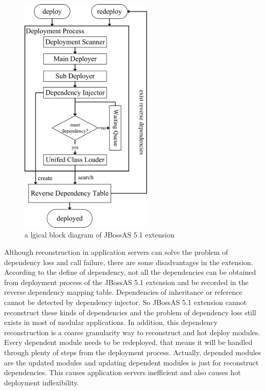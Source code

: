 \documentclass[conference]{IEEEtran}
\begin{document}
\begin{figure}[!t]
\centering
\includegraphics[width=2.5in]{deployment_process.jpg}
\caption{a lgical block diagram of JBossAS 5.1 extension}
\label{fig:deployment_process}
\end{figure}

Although reconstruction in application servers can solve the problem of dependency loss and call failure, there are some disadvantages in the extension.
According to the define of dependency, not all the dependencies can be obtained from deployment process of the JBossAS 5.1 extension and be recorded in the reverse dependency mapping table.
Dependencies of inheritance or reference cannot be detected by dependency injector.
So JBossAS 5.1 extension cannot reconstruct these kinds of dependencies and the problem of dependency loss still exists in most of modular applications.
In addition, this dependency reconstruction is a coarse granularity way to reconstruct and hot deploy modules.
Every dependent module needs to be redeployed, that means it will be handled through plenty of steps from the deployment process.
Actually, depended modules are the updated modules and updating dependent modules is just for reconstruct dependencies.
This causes application servers inefficient and also causes hot deployment inflexibility.

 
\end{document}
